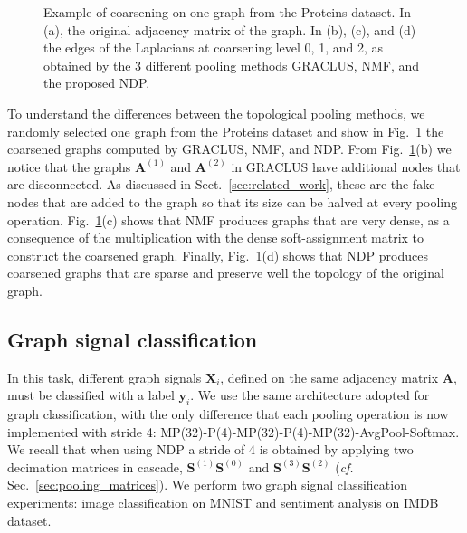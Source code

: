 \documentclass[journal]{IEEEtran}
\def\A{{\mathbf A}}
\def\S{{\mathbf S}}
\begin{document}
\begin{figure}[!ht]
    \centering
    \vspace{-.3cm}
    
    \vspace{-.3cm}
    
    \vspace{-.3cm}
    
    \caption{\footnotesize Example of coarsening on one graph from the Proteins dataset. In (a), the original adjacency matrix of the graph. In (b), (c), and (d) the edges of the Laplacians at coarsening level 0, 1, and 2, as obtained by the 3 different pooling methods GRACLUS, NMF, and the proposed NDP.}
    \label{fig:coarsening_enzymes}
\end{figure}

To understand the differences between the topological pooling methods, we randomly selected one graph from the Proteins dataset and show in Fig.~\ref{fig:coarsening_enzymes} the coarsened graphs computed by GRACLUS, NMF, and NDP.
From Fig.~\ref{fig:coarsening_enzymes}(b) we notice that the graphs $\A^{(1)}$ and $\A^{(2)}$ in GRACLUS have additional nodes that are disconnected.
As discussed in Sect.~\ref{sec:related_work}, these are the fake nodes that are added to the graph so that its size can be halved at every pooling operation.
Fig.~\ref{fig:coarsening_enzymes}(c) shows that NMF produces graphs that are very dense, as a consequence of the multiplication with the dense soft-assignment matrix to construct the coarsened graph.
Finally, Fig.~\ref{fig:coarsening_enzymes}(d) shows that NDP produces coarsened graphs that are sparse and preserve well the topology of the original graph.


\subsection{Graph signal classification}
In this task, different graph signals $\mathbf{X}_i$, defined on the same adjacency matrix $\mathbf{A}$, must be classified with a label $\mathbf{y}_i$.
We use the same architecture adopted for graph classification, with the only difference that each pooling operation is now implemented with stride 4: MP(32)-P(4)-MP(32)-P(4)-MP(32)-AvgPool-Softmax.
We recall that when using NDP a stride of 4 is obtained by applying two decimation matrices in cascade, $\S^{(1)}\S^{(0)}$ and $\S^{(3)}\S^{(2)}$ (\textit{cf.} Sec.~\ref{sec:pooling_matrices}).
We perform two graph signal classification experiments: image classification on MNIST and sentiment analysis on IMDB dataset.
\newline
\end{document}
